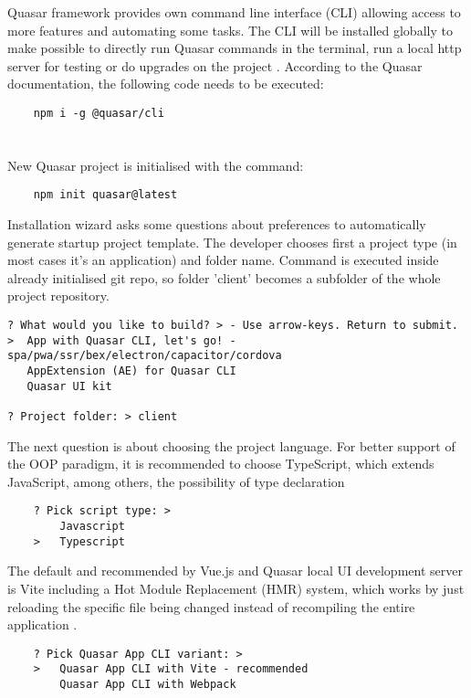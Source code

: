 Quasar framework provides own command line interface (CLI) allowing access to more features and automating some tasks. The CLI will be installed globally to make possible to directly run Quasar commands in the terminal, run a local http server for testing or do upgrades on the project \autocite{QuasarStart}. According to the Quasar documentation, the following code needs to be executed:

\begin{verbatim}
    npm i -g @quasar/cli

\end{verbatim}

\section{}%
\label{sec:installation}

New Quasar project is initialised with the command:
\begin{verbatim}
    npm init quasar@latest

\end{verbatim}

Installation wizard asks some questions about preferences to automatically generate startup project template. The developer chooses first a project type (in most cases it's an application) and folder name. Command is executed inside already initialised git repo, so folder 'client' becomes a subfolder of the whole project repository. 

\begin{verbatim}
? What would you like to build? > - Use arrow-keys. Return to submit.
>  App with Quasar CLI, let's go! - spa/pwa/ssr/bex/electron/capacitor/cordova
   AppExtension (AE) for Quasar CLI
   Quasar UI kit
   
? Project folder: > client

\end{verbatim}

The next question is about choosing the project language. For better support of the OOP paradigm, it is recommended to choose TypeScript, which extends JavaScript, among others, the possibility of type declaration \autocite{TSDoc}
\begin{verbatim}
    ? Pick script type: >
        Javascript
    >   Typescript

\end{verbatim}

The default and recommended by Vue.js and Quasar local UI development server is Vite including a Hot Module Replacement (HMR) system, which works by just reloading the specific file being changed instead of recompiling the entire application \autocite{Vite}. 
\begin{verbatim}
    ? Pick Quasar App CLI variant: >
    >   Quasar App CLI with Vite - recommended
        Quasar App CLI with Webpack

\end{verbatim}    

